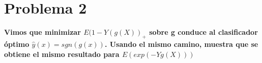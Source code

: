 \section*{Problema 2}

\textbf{Vimos que minimizar $E(1-Y(g(X))_+$ sobre g conduce al clasificador óptimo $\hat{y}(x)=sgn(g(x))$. Usando el mismo camino, muestra que se obtiene el mismo resultado para $E(exp(-Yg(X)))$}
